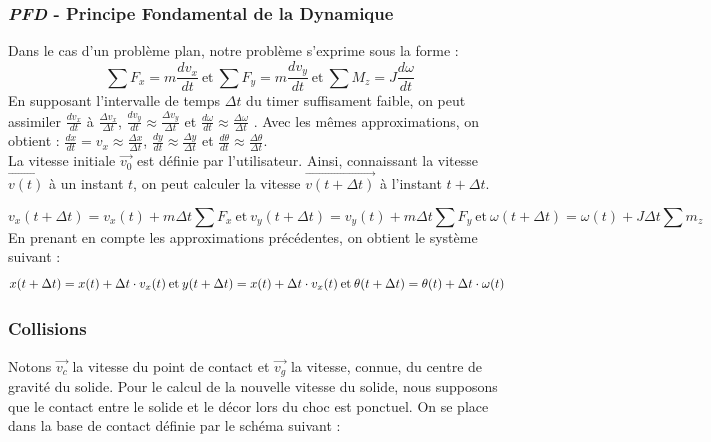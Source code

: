 \subsubsection{\emph{PFD} - Principe Fondamental de la Dynamique }
Dans le cas d'un problème plan, notre problème s'exprime sous la forme :
\begin{equation}
\sum F_x = m \frac {dv_x}{dt} \: \text{et} \: \sum F_y = m\frac{dv_y}{dt} \: \text{et} \: \sum M_z = J \frac {d\omega}{dt}
\end{equation}
En supposant l'intervalle de temps $\Delta t$ du timer suffisament faible, on peut assimiler
$\frac {dv_x}{dt}$ à $\frac{\Delta v_x}{\Delta t}$,
$ \frac {dv_y}{dt} \approx \frac{\Delta v_y}{\Delta t}$ et
$ \frac{d\omega}{dt} \approx \frac{\Delta \omega}{\Delta t}$ .
\newline
Avec les mêmes approximations, on obtient :
$\frac {dx}{dt} = v_x \approx \frac{\Delta x}{\Delta t}$, 
$ \frac {dy}{dt} \approx \frac{\Delta y}{\Delta t}$ et
$ \frac{d\theta}{dt} \approx \frac{\Delta \theta}{\Delta t}$. \\
La vitesse initiale $\overrightarrow{v_0}$ est définie par l'utilisateur.
Ainsi, connaissant la vitesse $\overrightarrow{v(t)}$ à un instant $t$,
on peut calculer la vitesse $\overrightarrow{v(t+\Delta t)}$ à l'instant $t + \Delta t$.

\begin{equation}
v_{x}(t+\Delta t)= v_{x}(t) + m \Delta t \sum F_x \: \text{et}\:
v_{y}(t+\Delta t)= v_{y}(t) + m\Delta t\sum F_y \: \text{et}\:
\omega (t + \Delta t)= \omega(t) + J\Delta t \sum m_z 
\end{equation}
En prenant en compte les approximations précédentes, on obtient le système suivant :
\begin{equation}
x(t+\Delta t) = x(t) +\Delta t \cdot v_{x}(t) \: \text{et} \:
y(t+\Delta t) = x(t) +\Delta t \cdot v_{x}(t) \: \text{et} \:
\theta (t+\Delta t) = \theta (t) + \Delta t \cdot \omega (t) \: \text \:
\end{equation}

\newpage
\subsubsection{Collisions}
Notons $\overrightarrow{v_c}$ la vitesse du point de contact et $\overrightarrow{v_g}$
la vitesse, connue, du centre de gravité du solide.
Pour le calcul de la nouvelle vitesse du solide, nous supposons que le contact
entre le solide et le décor lors du choc est ponctuel. 
On se place dans la base de contact définie par le schéma suivant :

